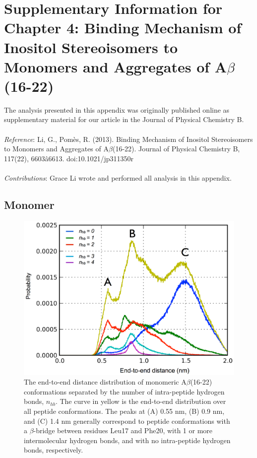 
\chapter[Supplementary Information for Chapter 4]{Supplementary Information for Chapter 4: Binding Mechanism of Inositol Stereoisomers to Monomers and Aggregates of A$\beta$(16-22)}

The analysis presented in this appendix was originally published online as supplementary material for our article in the Journal of Physical Chemistry B. 
\\
\\
\emph{Reference}:
Li, G., Pom\`{e}s, R. (2013). Binding Mechanism of Inositol Stereoisomers to Monomers and Aggregates of A$\beta$(16-22). Journal of Physical Chemistry B, 117(22), 6603â6613. doi:10.1021/jp311350r
\\
\\
\emph{Contributions}: 
Grace Li wrote and performed all analysis in this appendix.

\newpage

\section{Monomer}

\begin{figure}[ht]
\centering
\includegraphics[width=14cm]{figures/appendixA/inos2_figures_SI_monomer_eed_by_hbonds.pdf}
\caption{The end-to-end distance distribution of monomeric A$\beta$(16-22) conformations separated by the number of intra-peptide hydrogen bonds, $n_{hb}$. The curve in yellow is the end-to-end distribution over all peptide conformations. The peaks at (A) 0.55 nm, (B) 0.9 nm, and (C) 1.4 nm generally correspond to peptide conformations with a $\beta$-bridge between residues Leu17 and Phe20, with 1 or more intermolecular hydrogen bonds, and with no intra-peptide hydrogen bonds, respectively.}
\label{fig:SI-monomersEedByHbonds}
\end{figure}

